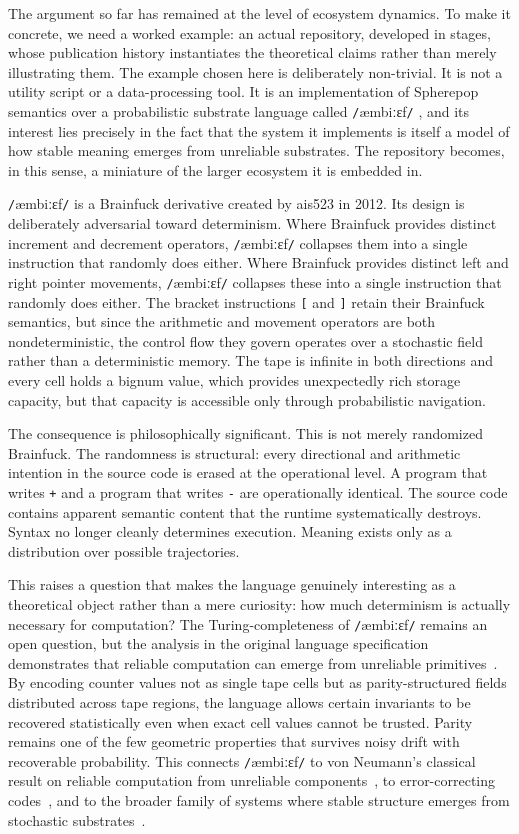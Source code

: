 \documentclass[11pt]{article}
\newcommand{\ambibf}{%
  \texttt{/}\textnormal{æmbiːɛf}\texttt{/}%
}
\begin{document}
The argument so far has remained at the level of ecosystem dynamics. To make
it concrete, we need a worked example: an actual repository, developed in
stages, whose publication history instantiates the theoretical claims rather
than merely illustrating them. The example chosen here is deliberately
non-trivial. It is not a utility script or a data-processing tool. It is an
implementation of Spherepop semantics over a probabilistic substrate language
called \ambibf{}, and its interest lies precisely in the fact that the system
it implements is itself a model of how stable meaning emerges from unreliable
substrates. The repository becomes, in this sense, a miniature of the larger
ecosystem it is embedded in.

\ambibf{} is a Brainfuck derivative created by ais523 in 2012. Its design is
deliberately adversarial toward determinism. Where Brainfuck provides distinct
increment and decrement operators, \ambibf{} collapses them into a single
instruction that randomly does either. Where Brainfuck provides distinct left
and right pointer movements, \ambibf{} collapses these into a single instruction
that randomly does either. The bracket instructions \texttt{[} and \texttt{]}
retain their Brainfuck semantics, but since the arithmetic and movement operators
are both nondeterministic, the control flow they govern operates over a
stochastic field rather than a deterministic memory. The tape is infinite in
both directions and every cell holds a bignum value, which provides unexpectedly
rich storage capacity, but that capacity is accessible only through
probabilistic navigation.

The consequence is philosophically significant. This is not merely randomized
Brainfuck. The randomness is structural: every directional and arithmetic
intention in the source code is erased at the operational level. A program that
writes \texttt{+} and a program that writes \texttt{-} are operationally
identical. The source code contains apparent semantic content that the runtime
systematically destroys. Syntax no longer cleanly determines execution. Meaning
exists only as a distribution over possible trajectories.

This raises a question that makes the language genuinely interesting as a
theoretical object rather than a mere curiosity: how much determinism is
actually necessary for computation? The Turing-completeness of \ambibf{}
remains an open question, but the analysis in the original language specification
demonstrates that reliable computation can emerge from unreliable
primitives~\cite{neumann1956}. By encoding counter values not as single tape
cells but as parity-structured fields distributed across tape regions, the
language allows certain invariants to be recovered statistically even when exact
cell values cannot be trusted. Parity remains one of the few geometric
properties that survives noisy drift with recoverable probability. This connects
\ambibf{} to von Neumann's classical result on reliable computation from
unreliable components~\cite{neumann1956}, to error-correcting codes~\cite{cover2006},
and to the broader family of systems where stable structure emerges from
stochastic substrates~\cite{wolfram2002}.
\end{document}
